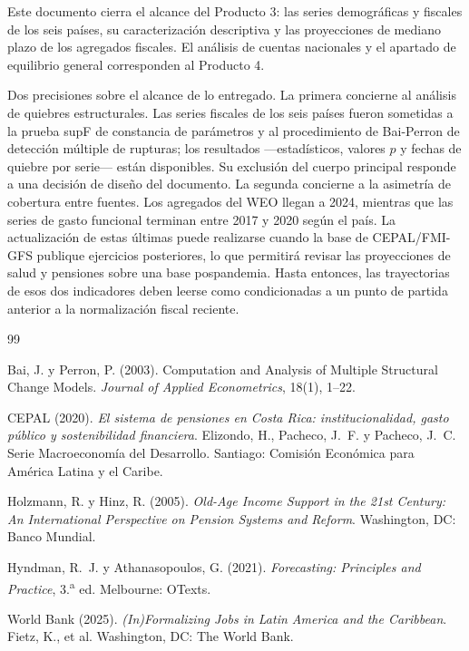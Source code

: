 \documentclass[12pt, letterpaper]{article}
\begin{document}
Este documento cierra el alcance del Producto 3: las series demográficas y fiscales de
los seis países, su caracterización descriptiva y las proyecciones de mediano plazo de
los agregados fiscales. El análisis de cuentas nacionales y el apartado de equilibrio
general corresponden al Producto 4.

Dos precisiones sobre el alcance de lo entregado. La primera concierne al análisis de
quiebres estructurales. Las series fiscales de los seis países fueron sometidas a la
prueba supF de constancia de parámetros y al procedimiento de Bai-Perron de detección
múltiple de rupturas; los resultados —estadísticos, valores $p$ y fechas de quiebre por serie— están disponibles. Su
exclusión del cuerpo principal responde a una decisión de diseño del documento. 
La segunda concierne a la asimetría de cobertura entre fuentes. Los agregados del WEO
llegan a 2024, mientras que las series de gasto funcional terminan entre 2017 y 2020
según el país. La actualización de estas últimas puede realizarse cuando la base de CEPAL/FMI-GFS publique ejercicios posteriores, lo que permitirá revisar las proyecciones de salud y pensiones
sobre una base pospandemia. Hasta entonces, las trayectorias de esos dos indicadores deben leerse como condicionadas a un punto de partida anterior a la normalización
fiscal reciente.
\newpage
{}

\begin{thebibliography}{99}

 Bai, J. y Perron, P. (2003).
Computation and Analysis of Multiple Structural Change Models.
\textit{Journal of Applied Econometrics}, 18(1), 1--22.

 CEPAL (2020). \textit{El sistema de pensiones en
Costa Rica: institucionalidad, gasto público y sostenibilidad financiera}.
Elizondo, H., Pacheco, J.~F. y Pacheco, J.~C. Serie Macroeconomía del Desarrollo.
Santiago: Comisión Económica para América Latina y el Caribe.

 Holzmann, R. y Hinz, R. (2005).
\textit{Old-Age Income Support in the 21st Century: An International Perspective
on Pension Systems and Reform}. Washington, DC: Banco Mundial.

 Hyndman, R.~J. y
Athanasopoulos, G. (2021). \textit{Forecasting: Principles and Practice},
3.\textsuperscript{a} ed. Melbourne: OTexts.

 World Bank (2025). \textit{(In)Formalizing Jobs in Latin America
and the Caribbean}. Fietz, K., et al. Washington, DC: The World Bank.

\end{thebibliography}
\end{document}
